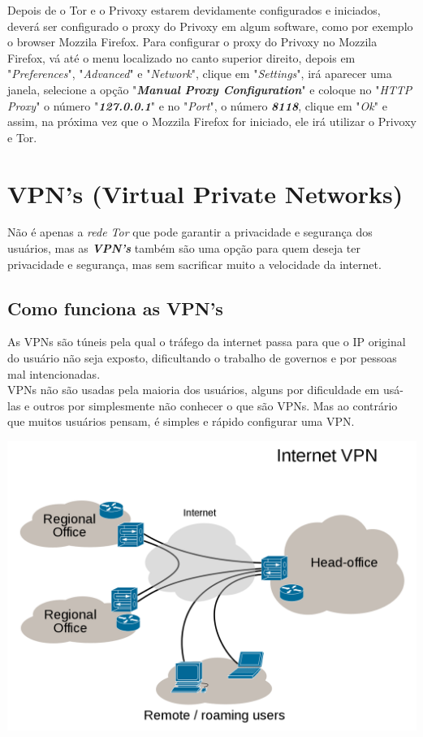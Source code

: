 \documentclass[12pt, letterpaper, Monospace:12]{report}
\begin{document}
	Depois de o Tor e o Privoxy estarem devidamente configurados e iniciados, deverá ser configurado o proxy do Privoxy em algum software, como por exemplo o browser Mozzila Firefox. Para configurar o proxy do Privoxy no Mozzila Firefox, vá até o menu localizado no canto superior direito, depois em "\textit{Preferences}", "\textit{Advanced}" e "\textit{Network}", clique em "\textit{Settings}", irá aparecer uma janela, selecione a opção "\textit{\textbf{Manual Proxy Configuration}}" e coloque no "\textit{HTTP Proxy}" o número "\textit{\textbf{127.0.0.1}}" e no "\textit{Port}", o número \textit{\textbf{8118}}, clique em "\textit{Ok}" e assim, na próxima vez que o Mozzila Firefox for iniciado, ele irá utilizar o Privoxy e Tor.\\

\pagebreak

\section{VPN's (Virtual Private Networks)}
	Não é apenas a \textit{rede Tor} que pode garantir a privacidade e segurança dos usuários, mas as \textit{\textbf{VPN's}} também são uma opção para quem deseja ter privacidade e segurança, mas sem sacrificar muito a velocidade da internet.

\subsection{Como funciona as VPN's}
	As VPNs são túneis pela qual o tráfego da internet passa para que o IP original do usuário não seja exposto, dificultando o trabalho de governos e por pessoas mal intencionadas.\\

	VPNs não são usadas pela maioria dos usuários, alguns por dificuldade em usá-las e outros por simplesmente não conhecer o que são VPNs. Mas ao contrário que muitos usuários pensam, é simples e rápido configurar uma VPN.

\begin{center}
	\includegraphics[scale=0.44]{vpn.png}
\end{center}
\end{document}

